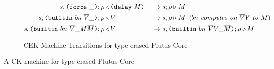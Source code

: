 \documentclass[../plutus-core-specification.tex]{subfiles}
\begin{document}
\begin{figure}[H]
\begin{subfigure}[c]{\linewidth}
\begin{minipage}{\linewidth}
\begin{alignat*}{2}
  s,\texttt{(} \texttt{force} ~ \_ \texttt{)}{};\rho & \triangleleft \texttt{(} \texttt{delay} ~ M \texttt{)}          &~\mapsto~& s;\rho \triangleright M\\
  s,\texttt{(} \texttt{builtin} ~ bn ~ \overline{V} \_  \texttt{)};\rho & \triangleleft V
                                                 &~\mapsto~&  s;\rho \triangleright M
                                                 \enspace (\textit{$bn$ computes on $\overline{V}V$ to $M$})\\
  s,\texttt{(} \texttt{builtin} ~ bn ~ \overline{V} \_ M \overline{M} \texttt{)};\rho & \triangleleft V
                                                 &~\mapsto~& s,\texttt{(} \texttt{builtin} ~ bn ~ \overline{V} V \_ \overline{M} \texttt{)};\rho
                                                 \triangleright M\\
    \end{alignat*}
\end{minipage}
    \caption{CEK Machine Transitions for type-erased Plutus Core}
    \label{fig:untyped-cek-transitions}
\end{subfigure}
\caption{A CK machine for type-erased Plutus Core}
\label{fig:untyped-cek-machine}
\end{figure}

\end{document}
